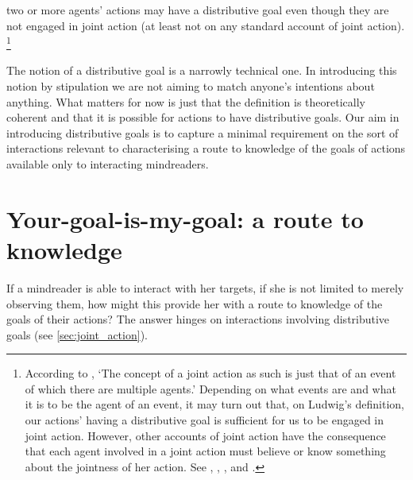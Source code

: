 \documentclass[14pt,a4paper]{extarticle}
\begin{document}
two or more agents' actions may have a distributive goal
even though they are not engaged in joint action
(at least not on any standard account of joint action).%
\footnote{
\label{fn:ludwig}
According to 
	 \citet[p.\ 366]{ludwig_collective_2007}, 
`The concept of a joint action as such is just that of an event of which there are multiple agents.'
Depending on what events are and what it is to be the agent of an event,
it may turn out that,
on Ludwig's definition,
our actions' having a distributive goal 
is sufficient for
us to be engaged in joint action.
However, other accounts of joint action have the consequence that each agent involved in a joint action must believe or know something about the jointness of her action.
See 
	\citet[p.\ 103]{Bratman:1993je}, %
	\citet[p.\ 40]{Butterfill:2011fk},
	\citet[p.\ 10]{Kutz:2000si}, %
	\citet[p. 56]{miller_social_2001} %
	and
	\citet[p.\ 361]{Roth:2004ki}. %
}


The notion of a distributive goal is a 
narrowly technical one.
In introducing this notion by stipulation we are not aiming to match anyone's intentions about anything.
What matters for now is just that the definition is theoretically coherent and that it is possible for actions to have distributive goals.
Our aim in introducing distributive goals 
 is to capture a minimal requirement on the sort of interactions 
relevant to characterising a route to knowledge of the goals of actions
available only to interacting mindreaders.
% 


\section{Your-goal-is-my-goal: a route to knowledge}
\label{sec:your_goal_is_my_goal}
If a mindreader is able to interact with her targets,
if she is not limited to merely observing them,
how might this provide her with a route to knowledge of the goals of their actions?
The answer hinges on interactions involving distributive goals
(see \vref{sec:joint_action}).
\end{document}
